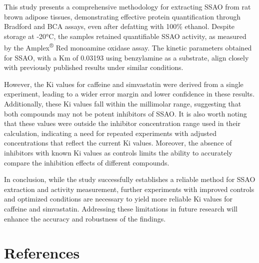 \documentclass[
  letterpaper,
  DIV=11,
  numbers=noendperiod]{scrreprt}
\begin{document}
This study presents a comprehensive methodology for extracting SSAO from
rat brown adipose tissues, demonstrating effective protein
quantification through Bradford and BCA assays, even after defatting
with 100\% ethanol. Despite storage at -20°C, the samples retained
quantifiable SSAO activity, as measured by the Amplex\textsuperscript{®}
Red monoamine oxidase assay. The kinetic parameters obtained for SSAO,
with a Km of 0.03193 using benzylamine as a substrate, align closely
with previously published results under similar conditions.

However, the Ki values for caffeine and simvastatin were derived from a
single experiment, leading to a wider error margin and lower confidence
in these results. Additionally, these Ki values fall within the
millimolar range, suggesting that both compounds may not be potent
inhibitors of SSAO. It is also worth noting that these values were
outside the inhibitor concentration range used in their calculation,
indicating a need for repeated experiments with adjusted concentrations
that reflect the current Ki values. Moreover, the absence of inhibitors
with known Ki values as controls limits the ability to accurately
compare the inhibition effects of different compounds.

In conclusion, while the study successfully establishes a reliable
method for SSAO extraction and activity measurement, further experiments
with improved controls and optimized conditions are necessary to yield
more reliable Ki values for caffeine and simvastatin. Addressing these
limitations in future research will enhance the accuracy and robustness
of the findings.


\chapter*{References}\label{references}

\end{document}
